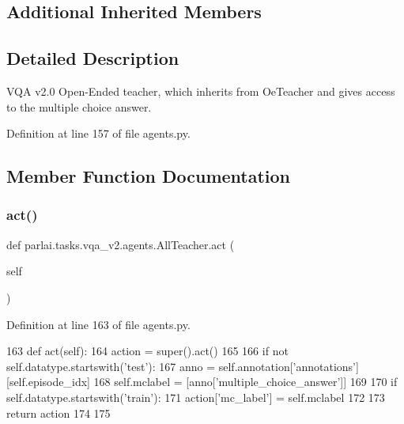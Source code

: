 \subsection*{Additional Inherited Members}


\subsection{Detailed Description}
\begin{DoxyVerb}VQA v2.0 Open-Ended teacher, which inherits from OeTeacher and gives access to the
multiple choice answer.
\end{DoxyVerb}
 

Definition at line 157 of file agents.\+py.



\subsection{Member Function Documentation}
\mbox{\label{classparlai_1_1tasks_1_1vqa__v2_1_1agents_1_1AllTeacher_a4a97c6641e40361ef66c5c6084eaebea}} 
\subsubsection{\texorpdfstring{act()}{act()}}
{\footnotesize\ttfamily def parlai.\+tasks.\+vqa\+\_\+v2.\+agents.\+All\+Teacher.\+act (\begin{DoxyParamCaption}\item[{}]{self }\end{DoxyParamCaption})}



Definition at line 163 of file agents.\+py.


\begin{DoxyCode}
163     \textcolor{keyword}{def }act(self):
164         action = super().act()
165 
166         \textcolor{keywordflow}{if} \textcolor{keywordflow}{not} self.datatype.startswith(\textcolor{stringliteral}{'test'}):
167             anno = self.annotation[\textcolor{stringliteral}{'annotations'}][self.episode\_idx]
168             self.mclabel = [anno[\textcolor{stringliteral}{'multiple\_choice\_answer'}]]
169 
170         \textcolor{keywordflow}{if} self.datatype.startswith(\textcolor{stringliteral}{'train'}):
171             action[\textcolor{stringliteral}{'mc\_label'}] = self.mclabel
172 
173         \textcolor{keywordflow}{return} action
174 
175 
\end{DoxyCode}


